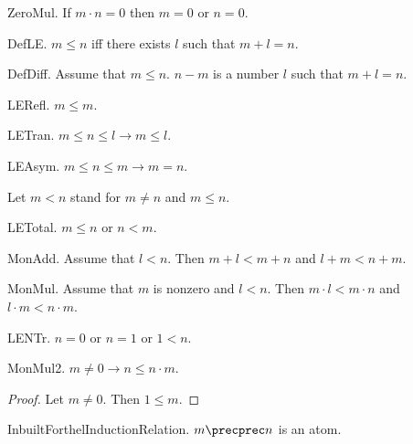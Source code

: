\begin{lemma} ZeroMul.
If $m \cdot n = 0$ then $m = 0$ or $n = 0$.
\end{lemma}

\begin{definition} DefLE.
$m \leq n$ iff there exists $l$ such that $m + l = n$.
\end{definition}

\begin{definition} DefDiff.  Assume that $m \leq n$.
$n - m$ is a number $l$ such that $m + l = n$.
\end{definition}

\begin{lemma} LERefl. $m \leq m$. \end{lemma}
\begin{lemma} LETran. $m \leq n \leq l  \rightarrow  m \leq l$.
\end{lemma}
\begin{lemma} LEAsym. $m \leq n \leq m  \rightarrow  m = n$. 
\end{lemma}

Let $m < n$ stand for $m \neq n$ and $m \leq n$.

\begin{axiom} LETotal. $m \leq n$ or $n < m$. \end{axiom}

\begin{lemma} MonAdd. Assume that $l < n$.
Then $m + l < m + n$ and $l + m < n + m$.
\end{lemma}

\begin{lemma} MonMul. Assume that $m$ is nonzero and $l < n$.
Then $m \cdot l < m \cdot n$ and $l \cdot m < n \cdot m$.
\end{lemma}

\begin{axiom} LENTr. 
$n = 0$ or $n = 1$ or $1 < n$.\end{axiom}


\begin{lemma} MonMul2. $m \neq 0 \rightarrow n \leq n \cdot m$.
\end{lemma}
\begin{proof}
Let $m \neq 0$. Then $1 \leq m$.
\end{proof}

\begin{signature} InbuiltForthelInductionRelation. $m \precprec n$ is an atom.
\end{signature}

